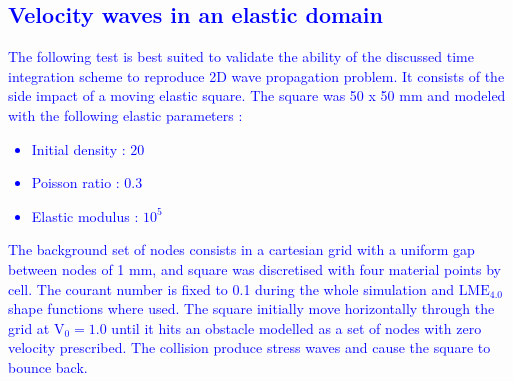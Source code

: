\documentclass[preprint,12pt,a4paper]{elsarticle}
\newcommand{\MODIFIED}[1]{
  \textcolor{blue}{{#1}}
}
\begin{document}
\MODIFIED{\subsection{Velocity waves in an elastic domain}}
\label{sec:Velocity-waves-elastic-domain}

\MODIFIED{The following test is best suited to validate the ability of the discussed
time integration scheme to reproduce 2D wave propagation problem.  It consists of the side impact of a moving elastic square. The square was 50 x 50 mm and modeled with the following elastic parameters :
\begin{itemize} 
\item  Initial density : $20$
\item  Poisson ratio : $0.3$
\item  Elastic modulus : $10^5$
\end{itemize}
}

\MODIFIED{The background set of nodes consists in a cartesian grid with a uniform gap between nodes of 1 mm, and square was discretised with four material points by cell. The courant number is fixed to 0.1 during the whole simulation and $\text{LME}_{4.0}$ shape functions where used. The square initially move horizontally through the grid at $\text{V}_0 = 1.0$ until it hits an obstacle modelled as a set of nodes with  zero velocity prescribed. The collision produce stress waves and cause the square to bounce back.}
\end{document}
